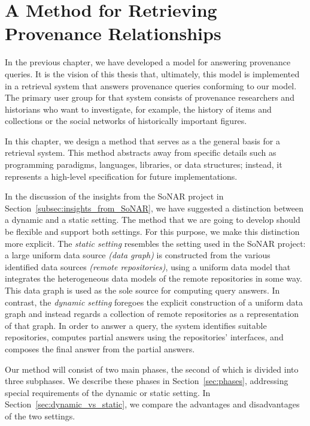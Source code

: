 \chapter{A Method for Retrieving Provenance Relationships}
\label{chap:retrieval}
\label{chap:method}

In the previous chapter, 
we have developed a model for answering provenance queries.
It is the vision of this thesis that, ultimately,
this model is implemented 
in a retrieval system
that answers provenance queries conforming to our model.
The primary user group for that system consists of provenance researchers
and historians who want to investigate, for example, the history of
items and collections or the social networks of historically important figures.

In this chapter, we design a method that serves
as a the general basis for a retrieval system.
This method abstracts away from specific details such as 
programming paradigms, languages, libraries, or data structures;
instead, it represents a high-level specification
for future implementations.

In the discussion of the insights from the \gls{SoNAR} project
in Section~\ref{subsec:insights_from_SoNAR},
we have suggested a distinction between a dynamic and a static setting.
The method that we are going to develop should be flexible
and support both settings.
For this purpose, we make this distinction more explicit.
The \emph{static setting} resembles the setting used in the SoNAR project:
a large uniform data source \emph{(data graph)} is constructed
from the various identified data sources \emph{(remote repositories)},
using a uniform data model that integrates the heterogeneous data models
of the remote repositories in some way. This data graph is 
used as the sole source for computing query answers.
In contrast, the \emph{dynamic setting} foregoes
the explicit construction of a uniform data graph and instead
regards a collection of remote repositories as a representation of that
graph. In order to answer a query, the system identifies
suitable repositories, computes partial answers using the repositories' interfaces,
and composes the final answer from the partial answers.

Our method will consist of two main phases, the second of which is divided
into three subphases.
We describe these phases in Section~\ref{sec:phases},
addressing special requirements of the dynamic or static setting.
In Section~\ref{sec:dynamic_vs_static}, we compare the 
advantages and disadvantages of the two settings.

